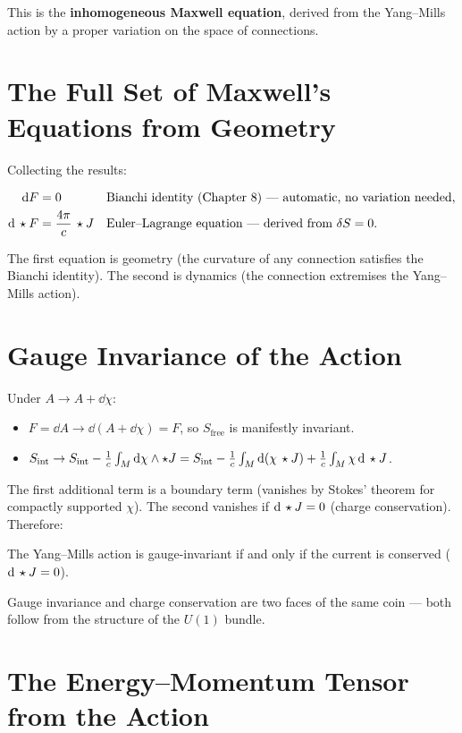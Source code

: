 This is the \textbf{inhomogeneous Maxwell equation}, derived from the Yang--Mills action by a proper variation on the space of connections.

\section{The Full Set of Maxwell's Equations from Geometry}

Collecting the results:

\begin{align}
\mathrm{d} F &= 0 & &\text{Bianchi identity (Chapter~8) --- automatic, no variation needed}, \\
\mathrm{d}\,\star F &= \frac{4\pi}{c}\,\star J & &\text{Euler--Lagrange equation --- derived from } \delta S = 0.
\end{align}

The first equation is geometry (the curvature of any connection satisfies the Bianchi identity). The second is dynamics (the connection extremises the Yang--Mills action).

\section{Gauge Invariance of the Action}

Under $A \to A + \dd\chi$:
\begin{itemize}
\item $F = \dd A \to \dd(A + \dd\chi) = F$, so $S_{\text{free}}$ is manifestly invariant.
\item $S_{\text{int}} \to S_{\text{int}} - \frac{1}{c}\int_M \mathrm{d}\chi \wedge \star J = S_{\text{int}} - \frac{1}{c}\int_M \mathrm{d}(\chi\,\star J) + \frac{1}{c}\int_M \chi\,\mathrm{d}\,\star J$.
\end{itemize}

The first additional term is a boundary term (vanishes by Stokes' theorem for compactly supported $\chi$). The second vanishes if $\mathrm{d}\,\star J = 0$ (charge conservation). Therefore:

\begin{proposition}
The Yang--Mills action is gauge-invariant if and only if the current is conserved ($\mathrm{d}\,\star J = 0$).
\end{proposition}

Gauge invariance and charge conservation are two faces of the same coin --- both follow from the structure of the $U(1)$ bundle.

\section{The Energy--Momentum Tensor from the Action}

